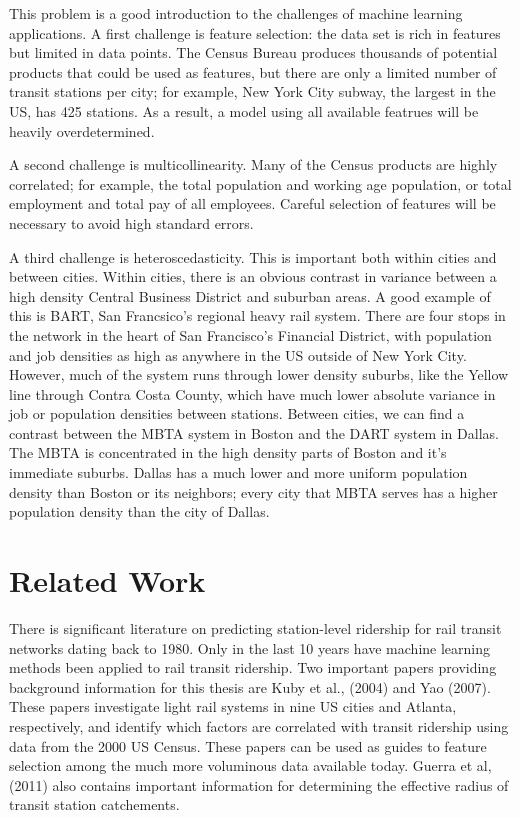 \documentclass{article}
\begin{document}
This problem is a good introduction to the challenges of machine learning applications. A first challenge is feature selection: the data set is rich in features but limited in data points. The Census Bureau produces thousands of potential products that could be used as features, but there are only a limited number of transit stations per city; for example, New York City subway, the largest in the US, has 425 stations. As a result, a model using all available featrues will be heavily overdetermined. 

A second challenge is multicollinearity. Many of the Census products are highly correlated; for example, the total population and working age population, or total employment and total pay of all employees. Careful selection of features will be necessary to avoid high standard errors. 

A third challenge is heteroscedasticity. This is important both within cities and between cities. Within cities, there is an obvious contrast in variance between a high density Central Business District and suburban areas. A good example of this is BART, San Francsico's regional heavy rail system. There are four stops in the network in the heart of San Francisco's Financial District, with population and job densities as high as anywhere in the US outside of New York City. However, much of the system runs through lower density suburbs, like the Yellow line through Contra Costa County, which have much lower absolute variance in job or population densities between stations. Between cities, we can find a contrast between the MBTA system in Boston and the DART system in Dallas. The MBTA is concentrated in the high density parts of Boston and it's immediate suburbs. Dallas has a much lower and more uniform population density than Boston or its neighbors; every city that MBTA serves has a higher population density than the city of Dallas. 

\section{Related Work}

There is significant literature on predicting station-level ridership for rail transit networks dating back to 1980. Only in the last 10 years have machine learning methods been applied to rail transit ridership. Two important papers providing background information for this thesis are Kuby et al., (2004) and Yao (2007). These papers investigate light rail systems in nine US cities and Atlanta, respectively, and identify which factors are correlated with transit ridership using data from the 2000 US Census. These papers can be used as guides to feature selection among the much more voluminous data available today. Guerra et al, (2011) also contains important information for determining the effective radius of transit station catchements. 
\end{document}
